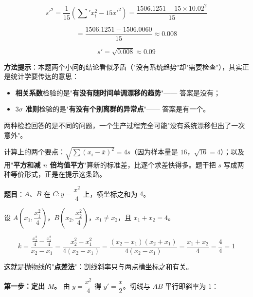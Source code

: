\[s'^{2}=\frac1{15}\left(\sum{}'x_i^{2}-15\bar x'^{2}\right)=\frac{1506.1251-15\times10.02^{2}}{15}\]

\[=\frac{1506.1251-1506.0060}{15}\approx0.008\]

\[s'=\sqrt{0.008}\approx0.09\]


\begin{gktip}
\textbf{方法提示}：本题两个小问的结论看似矛盾（"没有系统趋势"却"需要检查"），其实正是统计学要传达的意思：

\begin{itemize}
\item \textbf{相关系数}检验的是"\textbf{有没有随时间单调漂移的趋势}"—— 答案是没有；
\item \textbf{$3\sigma$ 准则}检验的是"\textbf{有没有个别离群的异常点}"—— 答案是有一个。
\end{itemize}

两种检验回答的是不同的问题，一个生产过程完全可能"没有系统漂移但出了一次意外"。

计算上的两个要点：$\sqrt{\sum\left(x_i-\bar x\right)^{2}}=4s$（因为样本量是 $16$，$\sqrt{16}=4$）；以及用"\textbf{平方和减 $n$ 倍均值平方}"算新的标准差，比逐个求差快得多。题干把 $s$ 写成两种等价形式，正是在提示这条路。
\end{gktip}

\par\medskip


\textbf{题目}：$A$、$B$ 在 $C:y=\dfrac{x^{2}}4$ 上，横坐标之和为 $4$。


设 $A\left(x_1,\dfrac{x_1^{2}}4\right)$，$B\left(x_2,\dfrac{x_2^{2}}4\right)$，$x_1\ne x_2$，且 $x_1+x_2=4$。

\[k=\frac{\frac{x_2^{2}}4-\frac{x_1^{2}}4}{x_2-x_1}=\frac{x_2^{2}-x_1^{2}}{4\left(x_2-x_1\right)}=\frac{\left(x_2-x_1\right)\left(x_2+x_1\right)}{4\left(x_2-x_1\right)}=\frac{x_1+x_2}4=\frac44=1\]


\begin{gktip}
这就是抛物线的"\textbf{点差法}"：割线斜率只与两点横坐标之和有关。
\end{gktip}


\textbf{第一步：定出 $M$。} 由 $y=\dfrac{x^{2}}4$ 得 $y'=\dfrac x2$。切线与 $AB$ 平行即斜率为 $1$：

